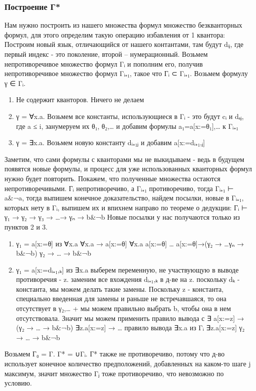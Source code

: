 \documentclass[11pt]{article}
\begin{document}
\subsubsection{Построение Г*}
\label{sec-8-7-1}
Нам нужно построить из нашего множества формул множество
безкванторных формул, для этого определим такую операцию
избавления от 1 квантора:
Построим новый язык, отличающийся от нашего контантами,
там будут dᵢⱼ, где первый индекс - это поколение, второй
– нумерационный.
Возьмем непротиворечивое множество формул Γᵢ и пополним
его, получив непротиворечивое множество формул Γᵢ₊₁, такое
что Гᵢ ⊂ Γᵢ₊₁.
Возьмем формулу γ ∈ Γᵢ.
\begin{enumerate}
\item Не содержит кванторов. Ничего не делаем
\item γ = ∀x.a. Возьмем все константы, использующиеся в Γᵢ -
это будут cᵢ и dₐⱼ, где a ≤ i, занумеруем их θ₁, θ₂,\ldots{}
и добавим формулы a₁=a[x:=θ₁],\ldots{} к Γᵢ₊₁
\item γ = ∃x.a. Возьмем новую константу dᵢ₊₁ⱼ и добавим
a[x:=dᵢ₊₁,ⱼ]
\end{enumerate}
Заметим, что сами формулы с кванторами мы не выкидываем -
ведь в будущем появятся новые формулы, и процесс для уже
использованных кванторных формул нужно будет повторить.
Покажем, что полученные множества остаются непротиворечивыми.
Гᵢ непротиворечиво, а Γᵢ₊₁ противоречиво, тогда Γᵢ₊₁ ⊢ a\&¬a,
тогда выпишем конечное доказательство, найдем посылки,
новые в Γᵢ₊₁, которых нету в Γᵢ, выпишем их и впихнем направо
по теореме о дедукции:
Гᵢ ⊢ γ₁ → γ₂ → γ₃ → \ldots{}→ γₙ → b\&¬b
Новые посылки у нас получаются только из пунктов 2 и 3.
\begin{enumerate}
\item γ₁ = a[x:=θ] из ∀x.a
∀x.a → a[x:=θ]
∀x.a
a[x:=θ]
\ldots{}
a[x:=θ]→(γ₂ → \ldots{}γₙ → b\&¬b)
γ₂ → \ldots{} → b\&¬b
\item γ₁ = a[x:=dᵢ₊₁,ₖ] из ∃x.a выберем переменную, не участвующую
в выводе противоречия - z. заменим все вхождения dᵢ₊₁,ₖ
в д-ве на z. поскольку dₖ - константа, мы можем делать такие
замены. Поскольку z - константа, специально введенная
для замены и раньше не встречавшаяся, то она отсутствует
в γ₂,\ldots{} + мы можем правильно выбрать b, чтобы она в нем
отсутствовала. Значит мы можем применить правило вывода с ∃
a[x:=z] → (γ₂ → \ldots{} → b\&¬b)
∃z.a[x:=z] → \ldots{}             правило вывода
∃x.a                         из Γᵢ
∃z.a[x:=z]
γ₂ → \ldots{} → b\&¬b
\end{enumerate}
Возьмем Г₀ = Γ. Γ* = ∪Γᵢ. Г* также не противоречиво, потому что
д-во использует конечное количество предположений, добавленных
на каком-то шаге j максимум, значит множество Γⱼ тоже противоречиво,
что невозможно по условию.
\end{document}
